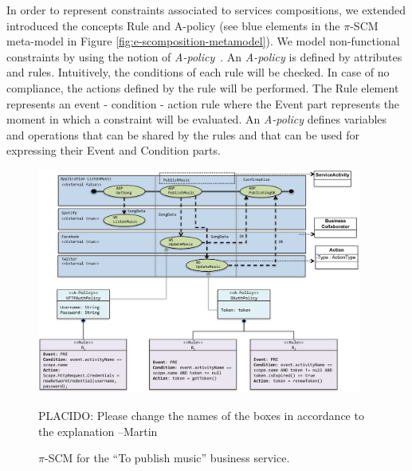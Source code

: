 \begin{itemizedTrivlist}
\item In order to represent constraints associated to services compositions, we extended introduced the concepts {\sc Rule} and {\sc A-policy} (see blue elements in the $\pi$-SCM meta-model in Figure \ref{fig:e-scomposition-metamodel}).
We model non-functional constraints by using the notion of {\em A-policy}~\cite{Espinosa-Oviedo2011a,CIC:eovszmc09c}.
An {\em A-policy} is defined by attributes and rules. 
Intuitively, the conditions of each rule will be checked.
In case of no compliance, the actions defined by the rule will be performed.
The {\sc Rule} element represents an event - condition - action rule where the {\sc Event} part represents the moment in which a constraint  will be evaluated.
An {\em A-policy} defines variables and operations that can be shared by the rules and that can be used for expressing their Event and Condition parts. 
\end{itemizedTrivlist}

\begin{figure}[t]%
\centering
\includegraphics[width=0.95\textwidth]{figs/e-composition-model}

{\color{red}\LARGE PLACIDO: Please change the names of the boxes in accordance to the explanation --Martin}

\caption{$\pi$-SCM for the ``To publish music'' business service.}
\label{fig:servicecompositionmodel}
\end{figure}

